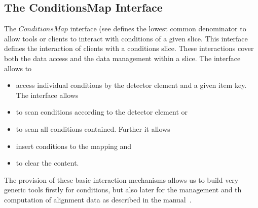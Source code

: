 \documentclass[10pt,a4paper]{article}
\begin{document}
\subsection{The ConditionsMap Interface}
\label{subsec:ddcond-conditionsmap}

\noindent
The $ConditionsMap$ interface (see 
defines the lowest common denominator to
allow tools or clients to interact with conditions of a given slice.
This interface defines the interaction of clients with a conditions slice.
These interactions cover both the data access and the data management 
within a slice. The interface allows to
\begin{itemize}\itemcompact
\item access individual conditions by the detector element
and a given item key. The interface allows
\item to scan conditions according to the detector element or 
\item to scan all conditions contained. Further it allows 
\item insert conditions to the mapping and
\item to clear the content.
\end{itemize}
The provision of these basic interaction mechanisms allows us to build
very generic tools firstly for conditions, but also later for the
management and th computation of alignment data as described in
the \DDA manual~\cite{bib:ddalign-manual}.
\end{document}
